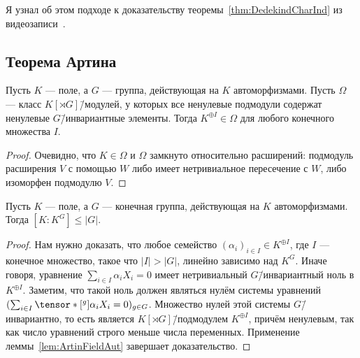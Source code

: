 \documentclass[
	extrafontsizes,
	11pt,
	hyphens,
]{memoir}
\begin{document}
\begin{remark}
Я узнал об этом подходе к доказательству теоремы~\ref{thm:DedekindCharInd} из видеозаписи~\cite[лекция 5, 1:06:40]{Gorchinskiy_Galois_2022}.
\end{remark}


\subsection{Теорема Артина}

\begin{lemma}
Пусть \(K\) --- поле, а \(G\) --- группа, действующая на \(K\) автоморфизмами.%
\label{lem:ArtinFieldAut}
Пусть \(\Omega\) --- класс \(K[\rtimes G]\)\=/модулей, у которых все ненулевые подмодули содержат ненулевые \(G\)\=/инвариантные элементы.
Тогда \(K^{\oplus I} \in \Omega\) для любого конечного множества \(I\).
\end{lemma}

\begin{proof}
Очевидно, что \(K \in \Omega\)
и \(\Omega\) замкнуто относительно расширений: подмодуль расширения \(V\) с помощью \(W\) либо имеет нетривиальное пересечение с \(W\), либо изоморфен подмодулю \(V\).
\end{proof}

\begin{theorem}
Пусть \(K\) --- поле, а \(G\) --- конечная группа, действующая на \(K\) автоморфизмами.
Тогда \([K : K^G] \leq \lvert G \rvert\).
\end{theorem}

\begin{proof}
Нам нужно доказать, что любое семейство \((\alpha_i)_{i \in I} \in K^{\oplus I}\), где \(I\) --- конечное множество, такое что \(\lvert I \rvert > \lvert G \rvert\), линейно зависимо над \(K^G\).
Иначе говоря, уравнение \(\sum_{i \in I} \alpha_i X_i = 0\) имеет нетривиальный \(G\)\=/инвариантный ноль в \(K^{\oplus I}\).
Заметим, что такой ноль должен являться нулём системы уравнений 
\(
(\sum_{i \in I} \tensor*[^g]{{\alpha_i}}{} X_i = 0)_{g \in G}
\).
Множество нулей этой системы \(G\)\=/инвариантно, то есть является \(K[\rtimes G]\)\=/подмодулем \(K^{\oplus I}\), причём ненулевым, так как число уравнений строго меньше числа переменных.
Применение леммы~\ref{lem:ArtinFieldAut} завершает доказательство.
\end{proof}
\end{document}
